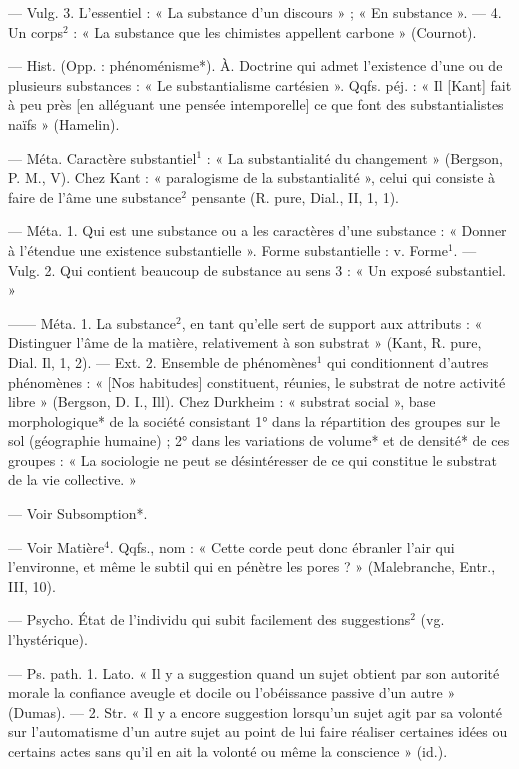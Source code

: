 \begin{itemize}[leftmargin=1cm, label=, itemsep=1pt]
— Vulg. 3. L'essentiel : « La
substance d’un discours » ; « En substance ». — 4. Un corps$^2$ : « La substance que les chimistes appellent
carbone » (Cournot).

 — Hist. (Opp. : phénoménisme*). À. Doctrine qui admet
l’existence d’une ou de plusieurs
substances : « Le substantialisme
cartésien ». Qqfs. péj. : « Il [Kant]
fait à peu près [en alléguant une
pensée intemporelle] ce que font des
substantialistes naïfs » (Hamelin).

 — Méta. Caractère substantiel$^1$ : « La substantialité du
changement » (Bergson, P. M., V).
Chez Kant : « paralogisme de la
substantialité », celui qui consiste à
faire de l'âme une substance$^2$ pensante (R. pure, Dial., II, 1, 1).

 — Méta. 1. Qui est une
substance ou a les caractères d'une
substance : « Donner à l'étendue
une existence substantielle ». Forme
substantielle : v. Forme$^1$. — Vulg.
2. Qui contient beaucoup de substance au sens 3 : « Un exposé substantiel. »

 —— Méta. 1. La
substance$^2$, en tant qu’elle sert de
support aux attributs : « Distinguer
l'âme de la matière, relativement à
son substrat » (Kant, R. pure, Dial.
Il, 1, 2). — Ext. 2. Ensemble de
phénomènes$^1$ qui  conditionnent
d’autres phénomènes : « [Nos habitudes] constituent, réunies, le substrat de notre activité libre » (Bergson, D. I., Ill). Chez Durkheim :
« substrat social », base morphologique* de la société consistant
1° dans la répartition des groupes
sur le sol (géographie humaine) ;
2° dans les variations de volume* et
de densité* de ces groupes : « La
sociologie ne peut se désintéresser
de ce qui constitue le substrat de la
vie collective. »

 — Voir Subsomption*.

 — Voir Matière$^4$. Qqfs., nom :
« Cette corde peut donc ébranler
l’air qui l’environne, et même le
subtil qui en pénètre les pores ? »
(Malebranche, Entr., III, 10).

 — Psycho. État de l’individu qui subit facilement des suggestions$^2$ (vg. l’hystérique).

 — Ps. path. 1. Lato. « Il y
a suggestion quand un sujet obtient
par son autorité morale la confiance
aveugle et docile ou l'obéissance
passive d’un autre » (Dumas). — 2.
Str. « Il y a encore suggestion lorsqu’un sujet agit par sa volonté sur
l’automatisme d’un autre sujet au
point de lui faire réaliser certaines
idées ou certains actes sans qu'il
en ait la volonté ou même la conscience » (id.).


\end{itemize}
